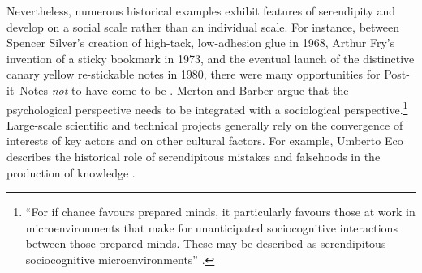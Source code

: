 Nevertheless, numerous historical examples exhibit features of
serendipity and develop on a social scale rather than an individual
scale.  For instance, between Spencer Silver's creation of high-tack,
low-adhesion glue in 1968, Arthur Fry's invention of a sticky bookmark in 1973,
and the eventual launch of the distinctive canary yellow re-stickable
notes in 1980, there were many opportunities for
Post-it\texttrademark\ Notes \emph{not} to have come to be
\cite{tce-postits}.  Merton and Barber argue that the
psychological perspective needs to be integrated with a
sociological perspective.\footnote{ ``For if chance favours prepared
  minds, it particularly favours those at work in microenvironments
  that make for unanticipated sociocognitive interactions between
  those prepared minds. These may be described as serendipitous
  sociocognitive microenvironments'' \cite[p. 259--260]{merton}.}
Large-scale scientific and technical projects generally rely on the
convergence of interests of key actors and on other cultural factors.
For example, Umberto Eco describes the
historical role of serendipitous mistakes and falsehoods in the
production of knowledge \citeyear{eco2013serendipities}.

